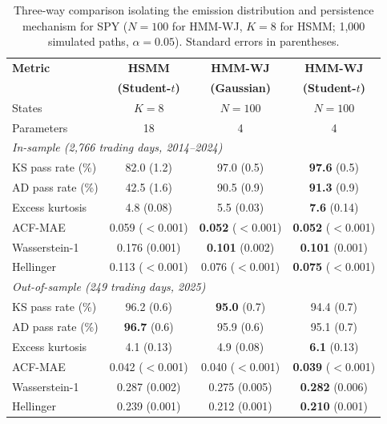 \begin{table}[tp]
\centering
\caption{Three-way comparison isolating the emission distribution and persistence mechanism for SPY ($N=100$ for HMM-WJ, $K=8$ for HSMM; 1{,}000 simulated paths, $\alpha=0.05$). Standard errors in parentheses.}
\label{tab:emission_hsmm_s9}
\small
\begin{tabular}{@{}lccc@{}}
\toprule
\textbf{Metric} & \textbf{HSMM} & \textbf{HMM-WJ} & \textbf{HMM-WJ} \\
                 & \textbf{(Student-$t$)} & \textbf{(Gaussian)} & \textbf{(Student-$t$)} \\ \midrule
States           & $K=8$ & $N=100$ & $N=100$ \\
Parameters       & 18    & 4       & 4 \\[4pt]
\multicolumn{4}{l}{\textit{In-sample (2{,}766 trading days, 2014--2024)}} \\[2pt]
KS pass rate (\%)      &  82.0 (1.2) &  97.0 (0.5) & \textbf{97.6} (0.5) \\
AD pass rate (\%)      &  42.5 (1.6) &  90.5 (0.9) & \textbf{91.3} (0.9) \\
Excess kurtosis        &   4.8 (0.08) &   5.5 (0.03) & \textbf{7.6} (0.14) \\
ACF-MAE                & 0.059 ({$<$}0.001) & \textbf{0.052} ({$<$}0.001) & \textbf{0.052} ({$<$}0.001) \\
Wasserstein-1          & 0.176 (0.001) & \textbf{0.101} (0.002) & \textbf{0.101} (0.001) \\
Hellinger              & 0.113 ({$<$}0.001) & 0.076 ({$<$}0.001) & \textbf{0.075} ({$<$}0.001) \\[4pt]
\multicolumn{4}{l}{\textit{Out-of-sample (249 trading days, 2025)}} \\[2pt]
KS pass rate (\%)      &  96.2 (0.6) & \textbf{95.0} (0.7) &  94.4 (0.7) \\
AD pass rate (\%)      & \textbf{96.7} (0.6) &  95.9 (0.6) &  95.1 (0.7) \\
Excess kurtosis        &   4.1 (0.13) &   4.9 (0.08) & \textbf{6.1} (0.13) \\
ACF-MAE                & 0.042 ({$<$}0.001) & 0.040 ({$<$}0.001) & \textbf{0.039} ({$<$}0.001) \\
Wasserstein-1          & 0.287 (0.002) & 0.275 (0.005) & \textbf{0.282} (0.006) \\
Hellinger              & 0.239 (0.001) & 0.212 (0.001) & \textbf{0.210} (0.001) \\
\bottomrule
\end{tabular}
\end{table}

